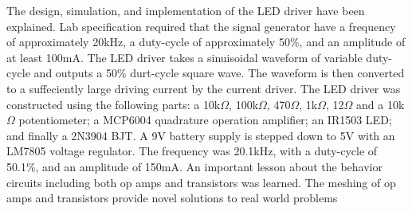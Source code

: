 
The design, simulation, and implementation of the LED driver have been explained. Lab specification required that the signal generator have a frequency of approximately 20kHz, a duty-cycle of approximately 50\%, and an amplitude of at least 100mA. The LED driver takes a sinuisoidal waveform of variable duty-cycle and outputs a 50\% durt-cycle square wave. The waveform is then converted to a suffeciently large driving current by the current driver. The LED driver was constructed using the following parts: a 10k$\Omega$, 100k$\Omega$, 470$\Omega$, 1k$\Omega$, 12$\Omega$ and a 10k$\Omega$ potentiometer; a MCP6004 quadrature operation amplifier; an IR1503 LED; and finally a 2N3904 BJT. A 9V battery supply is stepped down to 5V with an LM7805 voltage regulator. The frequency was 20.1kHz, with a duty-cycle of 50.1\%, and an amplitude of 150mA. 
An important lesson about the behavior circuits including both op amps and transistors was learned. The meshing of op amps and transistors provide novel solutions to real world problems



